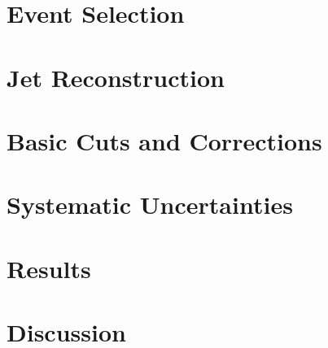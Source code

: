 \section{Event Selection }
\label{sec:event_selection}


\section{Jet Reconstruction}
\label{sec:reconstruction}


\section{Basic Cuts and Corrections}
\label{sec:cuts_corrections}


\section{Systematic Uncertainties}
\label{sec:systematic}


\section{Results}
\label{sec:results}


\section{Discussion}
\label{sec:discussion}


%

